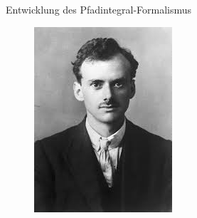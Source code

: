 \begin{frame}{Entwicklung des Pfadintegral-Formalismus}
\begin{figure}[H]
\begin{minipage}{0.315\textwidth}
	\includegraphics[width = \textwidth]{figures/dirac}	
	\end{minipage}
	\begin{minipage}{0.335\textwidth}

\end{minipage}
\end{figure}
\end{frame}
